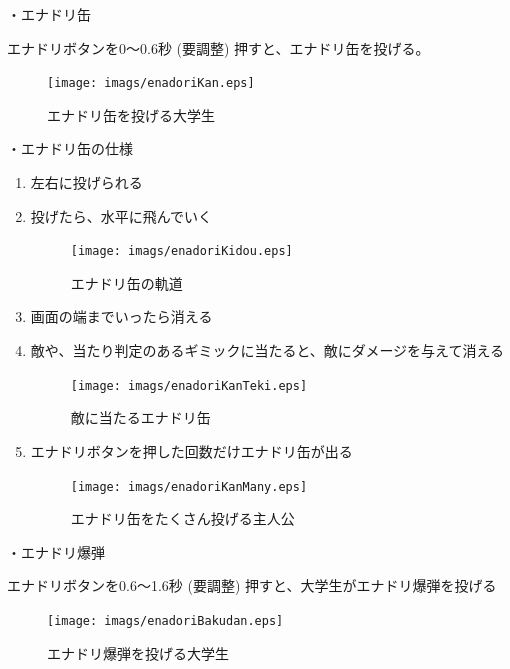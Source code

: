 \documentclass[12pt]{jsarticle}
\begin{document}
\newpage

・エナドリ缶

エナドリボタンを0〜0.6秒 (要調整) 押すと、エナドリ缶を投げる。

\begin{figure}[htbp]
  \begin{center}
    \texttt{[image: imags/enadoriKan.eps]}
  \end{center}
  \caption{エナドリ缶を投げる大学生}
\end{figure}

\newpage

・エナドリ缶の仕様

\begin{enumerate}
  \item 左右に投げられる
  \item 投げたら、水平に飛んでいく
  \begin{figure}[htbp]
    \begin{center}
      \texttt{[image: imags/enadoriKidou.eps]}
      \caption{エナドリ缶の軌道}
    \end{center}
  \end{figure}
  \item 画面の端までいったら消える
  \item 敵や、当たり判定のあるギミックに当たると、敵にダメージを与えて消える
  \begin{figure}[htbp]
    \begin{center}
      \texttt{[image: imags/enadoriKanTeki.eps]}
      \caption{敵に当たるエナドリ缶}
    \end{center}
  \end{figure}

  \newpage
  \item エナドリボタンを押した回数だけエナドリ缶が出る
  \begin{figure}[htbp]
    \begin{center}
      \texttt{[image: imags/enadoriKanMany.eps]}
      \caption{エナドリ缶をたくさん投げる主人公}
    \end{center}
  \end{figure}
\end{enumerate}

\newpage

・エナドリ爆弾

エナドリボタンを0.6〜1.6秒 (要調整) 押すと、大学生がエナドリ爆弾を投げる

\begin{figure}[htbp]
  \begin{center}
    \texttt{[image: imags/enadoriBakudan.eps]}
  \end{center}
  \caption{エナドリ爆弾を投げる大学生}
\end{figure}
\end{document}
